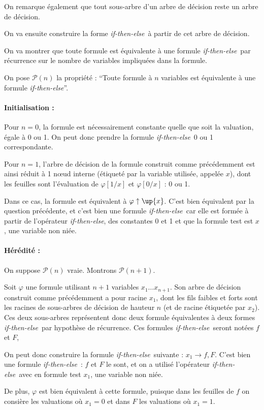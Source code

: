 \documentclass[12pt]{article}
\def\phix{\varphi\uparrow\up{x}}
\def\ite{\textit{if-then-else}}
\def\P{\mathcal{P}}
\begin{document}
On remarque également que tout sous-arbre d'un arbre de décision reste un arbre de décision. %

On va ensuite construire la forme \ite\ à partir de cet arbre de décision.

On va montrer que toute formule est équivalente à une formule \ite\ par récurrence sur le nombre de variables impliquées dans la formule.

On pose $\P(n)$ la propriété : ``Toute formule à $n$ variables est équivalente à une formule \ite''.

\paragraph{Initialisation : }
Pour $n=0$, la formule est nécessairement constante quelle que soit la valuation, égale à 0 ou 1. On peut donc prendre la formule \ite\ 0 ou 1 correspondante.

Pour $n=1$, l'arbre de décision de la formule construit comme précédemment est ainsi réduit à 1 n\oe ud interne (étiqueté par la variable utilisée, appelée $x$), dont les feuilles sont l'évaluation de $\varphi [ 1/x ]$ et $\varphi [ 0/x ]$ : 0 ou 1.

Dans ce cas, la formule est équivalent à $\phix$. C'est bien équivalent par la question précédente, et c'est bien une formule \ite\ car elle est formée à partir de l'opérateur \ite, des constantes 0 et 1 et que la formule test est $x$, une variable non niée.

\paragraph{Hérédité : }
On suppose $\P (n)$ vraie. Montrons $\P (n+1)$.

Soit $\varphi$ une formule utilisant $n+1$ variables $x_1\dots x_{n+1}$. Son arbre de décision construit comme précédemment a pour racine $x_1$, dont les fils faibles et forts sont les racines de sous-arbres de décision de hauteur $n$ (et de racine étiquetée par $x_2$). Ces deux sous-arbres représentent donc deux formule équivalentes à deux formes \ite\ par hypothèse de récurrence. Ces formules \ite\ seront notées $f$ et $F$,

On peut donc construire la formule \ite\ suivante : $x_1\rightarrow f,F$. C'est bien une formule \ite\ : $f$ et $F$ le sont, et on a utilisé l'opérateur \ite\ avec en formule test $x_1$, une variable non niée.

De plus, $\varphi$ est bien équivalent à cette formule, puisque dans les feuilles de $f$ on consière les valuations où $x_1 = 0$ et dans $F$ les valuations où $x_1 = 1$.
\end{document}
